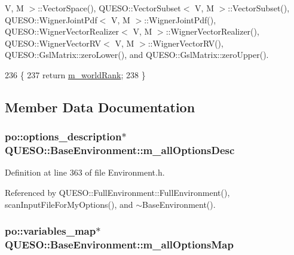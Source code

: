 V, M $>$\-::\-Vector\-Space(), Q\-U\-E\-S\-O\-::\-Vector\-Subset$<$ V, M $>$\-::\-Vector\-Subset(), Q\-U\-E\-S\-O\-::\-Wigner\-Joint\-Pdf$<$ V, M $>$\-::\-Wigner\-Joint\-Pdf(), Q\-U\-E\-S\-O\-::\-Wigner\-Vector\-Realizer$<$ V, M $>$\-::\-Wigner\-Vector\-Realizer(), Q\-U\-E\-S\-O\-::\-Wigner\-Vector\-R\-V$<$ V, M $>$\-::\-Wigner\-Vector\-R\-V(), Q\-U\-E\-S\-O\-::\-Gsl\-Matrix\-::zero\-Lower(), and Q\-U\-E\-S\-O\-::\-Gsl\-Matrix\-::zero\-Upper().


\begin{DoxyCode}
236 \{
237   \textcolor{keywordflow}{return} \hyperlink{class_q_u_e_s_o_1_1_base_environment_a464cab923ada0e14c6e3a4000c2ea385}{m\_worldRank};
238 \}
\end{DoxyCode}


\subsection{Member Data Documentation}
\hypertarget{class_q_u_e_s_o_1_1_base_environment_aac5465b02be108536bda1b5627456c97}{
\subsubsection[{m\-\_\-all\-Options\-Desc}]{\setlength{\rightskip}{0pt plus 5cm}po\-::options\-\_\-description$\ast$ Q\-U\-E\-S\-O\-::\-Base\-Environment\-::m\-\_\-all\-Options\-Desc\hspace{0.3cm}{\ttfamily [protected]}}}\label{class_q_u_e_s_o_1_1_base_environment_aac5465b02be108536bda1b5627456c97}


Definition at line 363 of file Environment.\-h.



Referenced by Q\-U\-E\-S\-O\-::\-Full\-Environment\-::\-Full\-Environment(), scan\-Input\-File\-For\-My\-Options(), and $\sim$\-Base\-Environment().

\hypertarget{class_q_u_e_s_o_1_1_base_environment_a2d8e668313b18f57e4607c3bec1ecda2}{
\subsubsection[{m\-\_\-all\-Options\-Map}]{\setlength{\rightskip}{0pt plus 5cm}po\-::variables\-\_\-map$\ast$ Q\-U\-E\-S\-O\-::\-Base\-Environment\-::m\-\_\-all\-Options\-Map\hspace{0.3cm}{\ttfamily [protected]}}}\label{class_q_u_e_s_o_1_1_base_environment_a2d8e668313b18f57e4607c3bec1ecda2}


